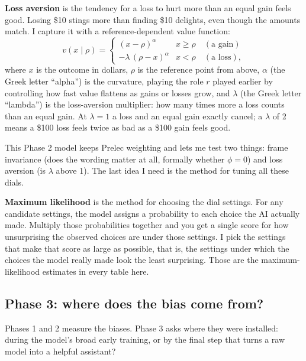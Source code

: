 \documentclass[11pt]{article}
\newcommand{\term}[1]{\textbf{\color{mossdk}#1}}
\begin{document}
\begin{defbox}
\term{Loss aversion} is the tendency for a loss to hurt more than an equal gain feels good. Losing \$10
stings more than finding \$10 delights, even though the amounts match. I capture it with a
reference-dependent value function:
\[
  v(x \mid \rho) =
  \begin{cases}
    (x - \rho)^{\alpha} & x \ge \rho \quad(\text{a gain}) \\[2pt]
    -\lambda\,(\rho - x)^{\alpha} & x < \rho \quad(\text{a loss}),
  \end{cases}
\]
where $x$ is the outcome in dollars, $\rho$ is the reference point from above, $\alpha$ (the Greek letter
``alpha'') is the curvature, playing the role $r$ played earlier by controlling how fast value flattens
as gains or losses grow, and $\lambda$ (the Greek letter ``lambda'') is the loss-aversion multiplier: how
many times more a loss counts than an equal gain. At $\lambda = 1$ a loss and an equal gain exactly
cancel; a $\lambda$ of 2 means a \$100 loss feels twice as bad as a \$100 gain feels good.
\end{defbox}

This Phase 2 model keeps Prelec weighting and lets me test two things: frame invariance (does the wording
matter at all, formally whether $\phi = 0$) and loss aversion (is $\lambda$ above 1). The last idea I
need is the method for tuning all these dials.

\begin{defbox}
\term{Maximum likelihood} is the method for choosing the dial settings. For any candidate settings, the
model assigns a probability to each choice the AI actually made. Multiply those probabilities together
and you get a single score for how unsurprising the observed choices are under those settings. I pick the
settings that make that score as large as possible, that is, the settings under which the choices the
model really made look the least surprising. Those are the maximum-likelihood estimates in every table
here.
\end{defbox}

\subsection{Phase 3: where does the bias come from?}

Phases 1 and 2 measure the biases. Phase 3 asks where they were installed: during the model's broad
early training, or by the final step that turns a raw model into a helpful assistant?
\end{document}
